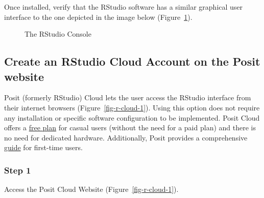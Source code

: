 \documentclass[
  letterpaper,
  DIV=11,
  numbers=noendperiod]{scrreprt}
\begin{document}
Once installed, verify that the RStudio software has a similar graphical
user interface to the one depicted in the image below
(Figure~\ref{fig-rstudio-console-1}).

\begin{figure}


\caption{\label{fig-rstudio-console-1}The RStudio Console}

\end{figure}%

\subsection{Create an RStudio Cloud Account on the Posit
website}\label{create-an-rstudio-cloud-account-on-the-posit-website}

Posit (formerly RStudio) Cloud lets the user access the RStudio
interface from their internet browsers (Figure~\ref{fig-r-cloud-1}).
Using this option does not require any installation or specific software
configuration to be implemented. Posit Cloud offers a
\href{https://posit.cloud/plans/free}{free plan} for casual users
(without the need for a paid plan) and there is no need for dedicated
hardware. Additionally, Posit provides a comprehensive
\href{https://posit.cloud/learn/guide}{guide} for first-time users.

\subsubsection{Step 1}\label{step-1-1}

Access the Posit Cloud Website (Figure~\ref{fig-r-cloud-1}).
\end{document}
